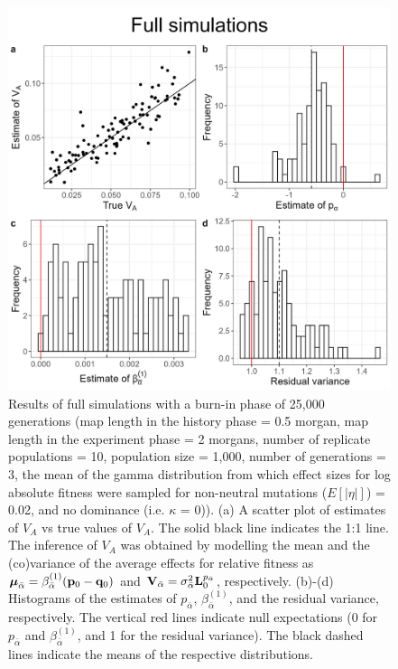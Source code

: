 \documentclass[12pt]{article}
\begin{document}
\begin{bibunit}
\begin{figure}[H]
\includegraphics[scale = 0.15]{Figures/full_main.jpg}
\caption{Results of full simulations with a burn-in phase of 25,000 generations (map length in the history phase = 0.5 morgan, map length in the experiment phase = 2 morgans, number of replicate populations = 10, population size = 1,000, number of generations = 3, the mean of the gamma distribution from which effect sizes for log absolute fitness were sampled for non-neutral mutations ($E[|\eta|]$) = 0.02, and no dominance (i.e. $\kappa$ = 0)). (a) A scatter plot of estimates of $V_A$ vs true values of $V_A$. The solid black line indicates the 1:1 line. The inference of $V_A$ was obtained by modelling the mean and the (co)variance of the average effects for relative fitness as $\boldsymbol{\mu}_{\bar{\alpha}} = \beta^{(1)}_{\bar{\alpha}}({\bf p}_{0}-{\bf q}_{0})$ and ${\bf V}_{\bar{\alpha}}=\sigma^2_{\bar{\alpha}}{\bf L}_{0}^{p_{\bar{\alpha}}}$, respectively.  (b)-(d) Histograms of the estimates of $p_{\bar \alpha} $, $\beta^{(1)}_{\bar{\alpha}}$, and the residual variance, respectively. The vertical red lines indicate null expectations (0 for $p_{\bar \alpha} $ and $\beta^{(1)}_{\bar{\alpha}}$, and 1 for the residual variance). The black dashed lines indicate the means of the respective distributions.}
  \label{fig:full_main}
\end{figure}


\end{bibunit}
\end{document}
